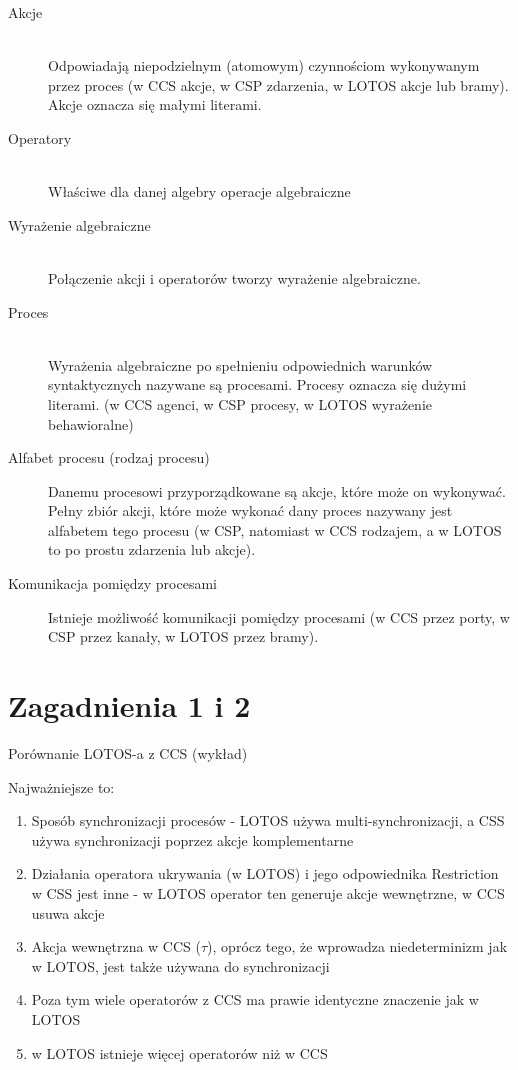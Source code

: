 \documentclass[a4paper,15pt]{article}
\newcommand{\issue}[2]{
    \begin{tcolorbox}[colback=issueColor!5!white,colframe=issueColor,title={Zagadnienie #1}]
        #2
    \end{tcolorbox}
}
\begin{document}
\begin{description}

\item[Akcje] \hfill \\ 
Odpowiadają niepodzielnym (atomowym) czynnościom wykonywanym przez proces (w CCS akcje, w CSP zdarzenia, w LOTOS akcje lub bramy). Akcje oznacza się małymi literami.

\item[Operatory] \hfill \\ 
Właściwe dla danej algebry operacje algebraiczne

\item[Wyrażenie algebraiczne] \hfill \\ 
Połączenie akcji i operatorów tworzy wyrażenie algebraiczne. 

\item[Proces] \hfill \\ 
Wyrażenia algebraiczne po spełnieniu odpowiednich warunków syntaktycznych nazywane są procesami. Procesy oznacza się dużymi literami. (w CCS agenci, w CSP procesy, w LOTOS wyrażenie behawioralne)

\item[Alfabet procesu (rodzaj procesu)]
Danemu procesowi przyporządkowane są akcje, które może on wykonywać. Pełny zbiór akcji, które może wykonać dany proces nazywany jest alfabetem tego procesu (w CSP, natomiast w CCS rodzajem, a w LOTOS to po prostu zdarzenia lub akcje).

\item[Komunikacja pomiędzy procesami]
Istnieje możliwość komunikacji pomiędzy procesami (w CCS przez porty, w CSP przez kanały, w LOTOS przez bramy).

\end{description}


\newpage
\section{Zagadnienia 1 i 2}

\issue{1}{
Porównanie LOTOS-a z CCS (wykład)
}

Najważniejsze to:
\begin{enumerate}
\item Sposób synchronizacji procesów - LOTOS używa multi-synchronizacji, a CSS używa synchronizacji poprzez akcje komplementarne
\item Działania operatora ukrywania (w LOTOS) i jego odpowiednika Restriction w CSS jest inne - w LOTOS operator ten generuje akcje wewnętrzne, w CCS usuwa akcje
\item Akcja wewnętrzna w CCS ($\tau$), oprócz tego, że wprowadza niedeterminizm jak w LOTOS, jest także używana do synchronizacji 
\item Poza tym wiele operatorów z CCS ma prawie identyczne znaczenie jak w LOTOS
\item w LOTOS istnieje więcej operatorów niż w CCS 
\end{enumerate}
\end{document}
